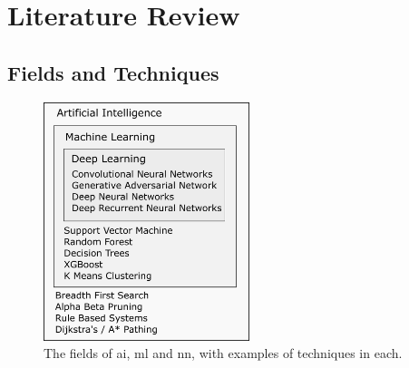 \chapter{Literature Review}



\section*{Fields and Techniques}

\begin{figure}
    \centering
    \includegraphics[width=60mm]{figs/ai_ml_dl.png}
    \caption{The fields of \gls{ai}, \gls{ml} and \gls{nn}, with examples of techniques in each.}
    \label{fig:ai_ml_dl} 
\end{figure}



